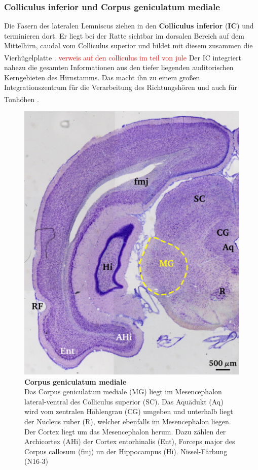\documentclass[12pt,a4paper,pdftex]{article}
\begin{document}
\newpage
\subsubsection*{Colliculus inferior und Corpus geniculatum mediale}

Die Fasern des lateralen Lemniscus ziehen in den \textbf{Colliculus inferior} (\textbf{IC})  und terminieren dort. Er liegt bei der Ratte sichtbar im dorsalen Bereich auf dem Mittelhirn, caudal vom Colliculus superior und bildet mit diesem zusammen die Vierhügelplatte \textsuperscript{\cite[29]{paxinos2014rat}}. \textcolor{red}{verweis auf den colliculus im teil von jule} 
Der IC integriert nahezu die gesamten Informationen aus den tiefer liegenden auditorischen Kerngebieten des Hirnstamms. Das macht ihn zu einem großen Integrationszentrum für die Verarbeitung des Richtungshören und auch für Tonhöhen \textsuperscript{\cite[29]{paxinos2014rat}}.
\\

\begin{figure}[H]
    \centering
    \includegraphics{pictures/auditory/MG.png}
    \caption[Corpus geniculatum mediale]{\textbf{Corpus geniculatum mediale}\\
    Das Corpus geniculatum mediale (MG) liegt im Mesencephalon lateral-ventral des Colliculus superior (SC). Das Aquädukt (Aq) wird vom zentralen Höhlengrau (CG) umgeben und unterhalb liegt der Nucleus ruber (R), welcher ebenfalls im Mesencephalon liegen. Der Cortex liegt um das Mesencephalon herum. Dazu zählen der Archicortex (AHi) der Cortex entorhinalis (Ent), Forceps major des Corpus callosum (fmj) un der Hippocampus (Hi). Nissel-Färbung (N16-3)}
    \label{fig:MG}
\end{figure}
\end{document}
